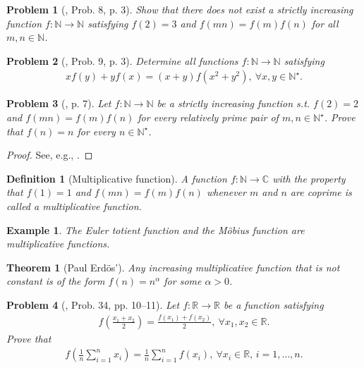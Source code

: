 \documentclass[oneside]{book}
\numberwithin{equation}{section}
\newtheorem{definition}{Definition}[section]
\newtheorem{theorem}{Theorem}[section]
\newtheorem{example}{Example}[section]
\newtheorem{problem}{Problem}[section]
\begin{document}
\begin{problem}[\cite{Gelca_Andreescu2017}, Prob. 8, p. 3]
	Show that there does not exist a strictly increasing function $f:\mathbb{N}\to\mathbb{N}$ satisfying $f(2) = 3$ and $f(mn) = f(m)f(n)$ for all $m,n\in\mathbb{N}$.
\end{problem}

\begin{problem}[\cite{Gelca_Andreescu2017}, Prob. 9, p. 3]
	Determine all functions $f:\mathbb{N}\to\mathbb{N}$ satisfying
	\begin{align*}
		xf(y) + yf(x) = (x + y)f(x^2 + y^2),\ \forall x,y\in\mathbb{N}^\star.
	\end{align*}
\end{problem}

\begin{problem}[\cite{Gelca_Andreescu2017}, p. 7]
	Let $f:\mathbb{N}\to\mathbb{N}$ be a strictly increasing function s.t. $f(2) = 2$ and $f(mn) = f(m)f(n)$ for every relatively prime pair of $m,n\in\mathbb{N}^\star$. Prove that $f(n) = n$ for every $n\in\mathbb{N}^\star$.
\end{problem}

\begin{proof}[Proof]
	See, e.g., \cite[p. 8]{Gelca_Andreescu2017}.
\end{proof}

\begin{definition}[Multiplicative function]
	A function $f:\mathbb{N}\to\mathbb{C}$ with the property that $f(1) = 1$ and $f(mn) = f(m)f(n)$ whenever $m$ and $n$ are coprime is called a \emph{multiplicative function}.
\end{definition}

\begin{example}
	The \emph{Euler totient function} and the \emph{M\"obius function} are multiplicative functions.
\end{example}

\begin{theorem}[Paul Erd\"os']
	Any increasing multiplicative function that is not constant is of the form $f(n) = n^\alpha$ for some $\alpha > 0$.
\end{theorem}

\begin{problem}[\cite{Gelca_Andreescu2017}, Prob. 34, pp. 10--11]
	Let $f:\mathbb{R}\to\mathbb{R}$ be a function satisfying
	\begin{align*}
		f\left(\frac{x_1 + x_2}{2}\right) = \frac{f(x_1) + f(x_2)}{2},\ \forall x_1,x_2\in\mathbb{R}.
	\end{align*}
	Prove that
	\begin{align*}
		f\left(\frac{1}{n}\sum_{i=1}^n x_i\right) = \frac{1}{n}\sum_{i=1}^n f(x_i),\ \forall x_i\in\mathbb{R},\,i = 1,\ldots,n.
	\end{align*}
\end{problem}
\end{document}

